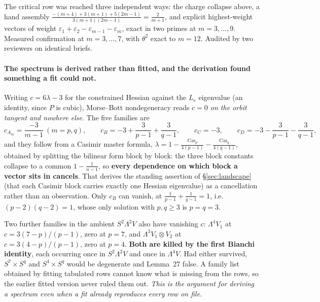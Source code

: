 \begin{certificate}
The critical row was reached three independent ways: the charge collapse above, a hand assembly $\frac{-(m+4)+3(m+1)+5(2m-1)}{3(m+1)(2m-1)}=\frac2{m+1}$, and explicit highest-weight vectors of weight $\varepsilon_1+\varepsilon_2-\varepsilon_{m-1}-\varepsilon_m$, exact in two primes at $m=3,\dots,9$. Measured confirmation at $m=3,\dots,7$, with $\theta^2$ exact to $m=12$. Audited by two reviewers on identical briefs.
\end{certificate}

\paragraph{The spectrum is derived rather than fitted, and the derivation found something a fit could not.} Writing $c=6\lambda-3$ for the constrained Hessian against the $L_e$ eigenvalue (an identity, since $P$ is cubic), Morse--Bott nondegeneracy reads \emph{$c=0$ on the orbit tangent and nowhere else}. The five families are
\[
c_{A_m}=\frac{-3}{m-1}\ (m=p,q),\qquad c_B=-3+\frac3{p-1}+\frac3{q-1},\qquad c_C=-3,\qquad c_D=-3-\frac3{p-1}-\frac3{q-1},
\]
and they follow from a Casimir master formula, $\lambda=1-\tfrac{\mathrm{Cas}_p}{4(p-1)}-\tfrac{\mathrm{Cas}_q}{4(q-1)}$, obtained by splitting the bilinear form block by block: the three block constants collapse to a common $1-\tfrac1{n-1}$, so \textbf{every dependence on which block a vector sits in cancels}. That derives the standing assertion of \S\ref{sec:landscape} (that each Casimir block carries exactly one Hessian eigenvalue) as a cancellation rather than an observation. Only $c_B$ can vanish, at $\tfrac1{p-1}+\tfrac1{q-1}=1$, i.e.\ $(p-2)(q-2)=1$, whose only solution with $p,q\ge3$ is $p=q=3$.

\begin{remarkstar}
Two further families in the ambient $S^2\Lambda^2V$ also have vanishing $c$: $\Lambda^4V_1$ at $c=3(7-p)/(p-1)$, zero at $p=7$, and $\Lambda^3V_1\otimes V_2$ at $c=3(4-p)/(p-1)$, zero at $p=4$. \textbf{Both are killed by the first Bianchi identity}, each occurring once in $S^2\Lambda^2V$ and once in $\Lambda^4V$. Had either survived, $S^7\times S^q$ and $S^4\times S^q$ would be degenerate and Lemma~27 false. A family list obtained by fitting tabulated rows cannot know what is missing from the rows, so the earlier fitted version never ruled them out. \emph{This is the argument for deriving a spectrum even when a fit already reproduces every row on file.}
\end{remarkstar}

